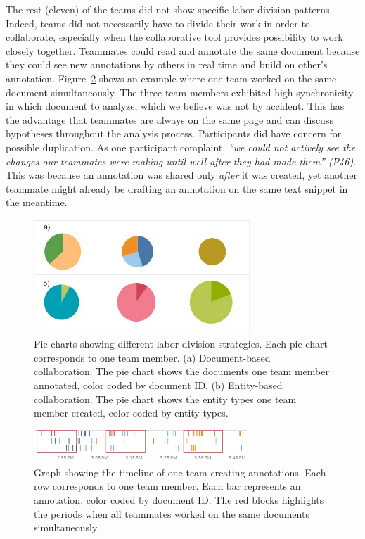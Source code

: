The rest (eleven) of the teams did not show specific labor division
patterns. Indeed, teams did not necessarily have to divide their work in
order to collaborate, especially when the collaborative tool provides
possibility to work closely together. Teammates could read and annotate
the same document because they could see new annotations by others in
real time and build on other's annotation. Figure~\ref{fig:close_collaboration}
shows an example where one team worked on the same document simultaneously.
The three team members exhibited high synchronicity in which document to
analyze, which we believe was not by accident. This has the advantage that
teammates are always on the same page and can discuss hypotheses
throughout the analysis process. Participants did have concern for
possible duplication. As one participant complaint, \emph{``we could not
actively see the changes our teammates were making until well after they
had made them'' (P46)}. This was because an annotation was shared only
\emph{after} it was created, yet another teammate might already be drafting an
annotation on the same text snippet in the meantime.

\begin{figure}
\centering
\includegraphics[width=3.20000in]{img/labor_division.jpg}
\caption{Pie charts showing different labor division strategies. Each
pie chart corresponds to one team member. (a) Document-based
collaboration. The pie chart shows the documents one team member
annotated, color coded by document ID. (b) Entity-based collaboration.
The pie chart shows the entity types one team member created, color
coded by entity types.\label{fig:labor_division}}
\end{figure}

\begin{figure}
\centering
\includegraphics[width=3.20000in]{img/close_collaboration.jpg}
\caption{Graph showing the timeline of one team creating annotations.
Each row corresponds to one team member. Each bar represents an
annotation, color coded by document ID. The red blocks highlights the
periods when all teammates worked on the same documents
simultaneously.\label{fig:close_collaboration}}
\end{figure}


